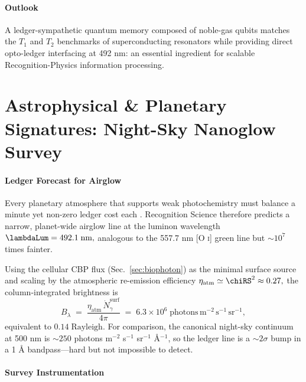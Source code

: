 \documentclass[11pt,oneside]{book}
\begin{document}
{\paragraph*{Outlook}

A ledger-sympathetic quantum memory composed of noble-gas qubits
matches the $T_{1}$ and $T_{2}$ benchmarks of superconducting resonators
while providing direct opto-ledger interfacing at 492 nm:
an essential ingredient for scalable Recognition-Physics information
processing.


\section{Astrophysical \& Planetary Signatures: Night-Sky Nanoglow Survey}
\label{sec:nanoglow}

\paragraph{Ledger Forecast for Airglow}

Every planetary atmosphere that supports weak photochemistry must
balance a minute yet non-zero ledger cost each \Chronon.  
Recognition Science therefore predicts a narrow, planet-wide
airglow line at the luminon wavelength
\(
   \lambdaLum = 492.1\;\text{nm},
\)
analogous to the 557.7 nm [O \textsc{i}] green line but
$\sim10^{7}$ times fainter.

Using the cellular CBP flux
(Sec.~\ref{sec:biophoton}) as the minimal surface source and scaling
by the atmospheric re-emission efficiency
\(
   \eta_{\text{atm}}\simeq\chiRS^{2}\approx0.27,
\)
the column‐integrated brightness is
\[
   B_{\lambda}
   \;=\;
   \frac{\eta_{\text{atm}}\,
         \dot N_{\gamma}^{\text{surf}}}{4\pi}
   \;=\;
   6.3\times10^{6}\;\text{photons}\,
      \text{m}^{-2}\,\text{s}^{-1}\,\text{sr}^{-1},
\]
equivalent to
\(
   0.14\;\text{Rayleigh}.
\)
For comparison, the canonical night-sky continuum at 500 nm is
$\sim250$ photons m$^{-2}$ s$^{-1}$ sr$^{-1}$ Å$^{-1}$,
so the ledger line is a $\sim2\sigma$ bump in a 1 Å bandpass—hard but
not impossible to detect.

\paragraph{Survey Instrumentation}

}
\end{document}
